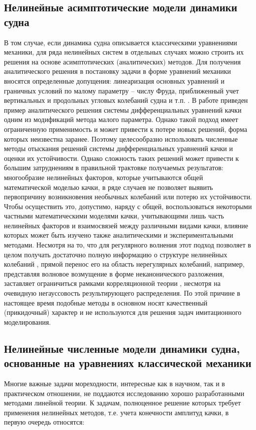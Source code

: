 \subsection{Нелинейные асимптотические модели динамики судна}
В том случае, если динамика судна описывается классическими уравнениями механики, для ряда нелинейных систем в отдельных случаях можно строить их решения на основе асимптотических (аналитических) методов. Для получения аналитического решения в постановку задачи в форме уравнений механики вносятся определенные допущения: линеаризация основных уравнений и граничных условий по малому параметру – числу Фруда, приближенный учет вертикальных и продольных угловых колебаний судна и т.п. \citep{dk16}. В работе \citep{dk17} приведен пример аналитического решения системы дифференциальных уравнений качки одним из модификаций метода малого параметра. Однако такой подход имеет ограниченную применимость и может привести к потере новых решений, форма которых неизвестна заранее. Поэтому целесообразно использовать численные методы отыскания решений системы дифференциальных уравнений качки и оценки их устойчивости. Однако сложность таких решений может привести к большим затруднениям в правильной трактовке получаемых результатов: многообразие нелинейных факторов, которые учитываются общей математической моделью качки, в ряде случаев не позволяет выявить первопричину возникновения необычных колебаний или потерю их устойчивости. Чтобы осуществить это, допустимо, наряду с общей, воспользоваться некоторыми частными математическими моделями качки, учитывающими лишь часть нелинейных факторов и взаимосвязей между различными видами качки, влияние которых может быть изучено также аналитическими и экспериментальными методами. Несмотря на то, что для регулярного волнения этот подход позволяет в целом получать достаточно полную информацию о структуре нелинейных колебаний \citep{dk17}, прямой перенос его на область нерегулярных колебаний, например, представляя волновое возмущение в форме неканонического разложения, заставляет ограничиться рамками корреляционной теории \citep{dk18}, несмотря на очевидную негауссовость результирующего распределения. По этой причине в настоящее время подобные методы в основном носят качественный (прикидочный) характер и не используются для решения задач имитационного моделирования.

\subsection{Нелинейные численные модели динамики судна, основанные на уравнениях классической механики}
Многие важные задачи мореходности, интересные как в научном, так и в практическом отношении, не поддаются исследованию хорошо разработанными методами линейной теории. К задачам, полноценное решение которых требует применения нелинейных методов, т.е. учета конечности амплитуд качки, в первую очередь относятся:

